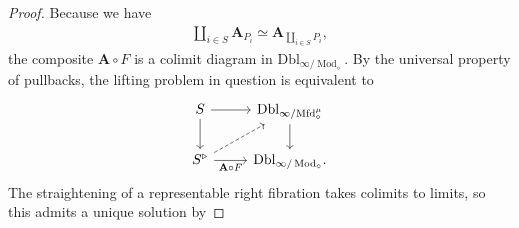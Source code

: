 \documentclass[10pt]{amsart}
\numberwithin{equation}{section}
\theoremstyle{definition}
\DeclareMathOperator{\Mod}{Mod}
\newcommand{\Mfd}{\mathrm{Mfd}\vphantom{d}}
\newcommand{\bfA}{\mathbf{A}}
\newcommand{\Dbl}{\mathrm{Dbl}}
\begin{document}
\begin{proof}
	Because we have
	\begin{align*}
		\coprod_{i\in S} \bfA_{P_{i}} \simeq \bfA_{\coprod_{i\in S} P_{i}},
	\end{align*}
	the composite $\bfA \circ F$ is a colimit diagram in $\Dbl_{\infty/\Mod_{\diamond}}$. By the universal property of pullbacks, the lifting problem in question is equivalent to
	\begin{equation*}
		\begin{tikzcd}
			S \arrow[r] \arrow[d]      &   \Dbl_{\infty/\Mfd_{\diamond}^{\mu}}  \arrow[d] \\
			S^{\triangleright}  \arrow[r, "\bfA\circ F"']  \arrow[ur, dashed]             &   \Dbl_{\infty/\Mod_{\diamond}}.
		\end{tikzcd}
	\end{equation*}
	The straightening of a representable right fibration takes colimits to limits, so this admits a unique solution by 
\end{proof}
\end{document}
